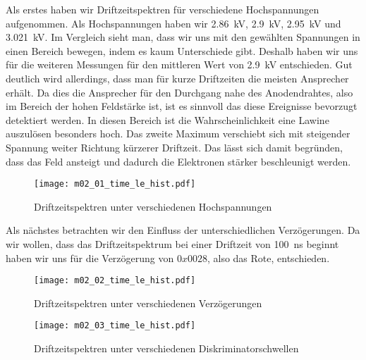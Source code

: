 \documentclass[11pt, ngerman, fleqn, DIV=15, headinclude, BCOR=2cm]{scrreprt}
\begin{document}
Als erstes haben wir Driftzeitspektren für verschiedene Hochspannungen
aufgenommen.
Als Hochspannungen haben wir \SI{2,86}{\kilo\volt},
\SI{2,9}{\kilo\volt}, \SI{2,95}{\kilo\volt} und \SI{3,021}{\kilo\volt}.
Im Vergleich sieht man, dass wir uns mit den gewählten Spannungen in einen
Bereich bewegen, indem es kaum Unterschiede gibt.
Deshalb haben wir uns für die weiteren Messungen für den mittleren Wert von
\SI{2,9}{\kilo\volt} entschieden.
Gut deutlich wird allerdings, dass man für kurze Driftzeiten die meisten
Ansprecher erhält. Da dies die Ansprecher für den Durchgang nahe des
Anodendrahtes, also im Bereich der hohen Feldstärke ist, ist es sinnvoll das
diese Ereignisse bevorzugt detektiert werden.
In diesen Bereich ist die Wahrscheinlichkeit eine Lawine auszulösen
besonders hoch.
Das zweite Maximum verschiebt sich mit steigender Spannung
weiter Richtung kürzerer Driftzeit. Das lässt sich damit begründen, dass das
Feld ansteigt und dadurch die Elektronen stärker beschleunigt werden.

\begin{figure}
    \centering
    \texttt{[image: m02\_01\_time\_le\_hist.pdf]}
    \caption{%
	    Driftzeitspektren unter verschiedenen Hochspannungen
   }
    \label{fig:m02_01_driftzeitspektrum}
\end{figure}

Als nächstes betrachten wir den Einfluss der unterschiedlichen Verzögerungen.
Da wir wollen, dass das Driftzeitspektrum bei einer Driftzeit von
\SI{100}{\nano\second} beginnt haben wir uns für die Verzögerung von
$0x0028$, also das Rote, entschieden.

\begin{figure}
    \centering
    \texttt{[image: m02\_02\_time\_le\_hist.pdf]}
    \caption{%
	    Driftzeitspektren unter verschiedenen Verzögerungen
   }
    \label{fig:m02_02_driftzeitspektrum}
\end{figure}


\begin{figure}
    \centering
    \texttt{[image: m02\_03\_time\_le\_hist.pdf]}
    \caption{%
	    Driftzeitspektren unter verschiedenen Diskriminatorschwellen
   }
    \label{fig:m02_03_driftzeitspektrum}
\end{figure}



\end{document}
